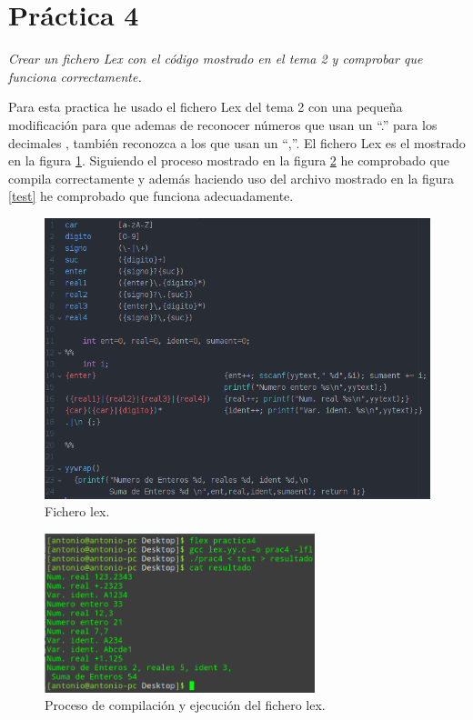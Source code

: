 \section{Práctica 4}
\textit{Crear un fichero Lex con el código mostrado en el tema 2 y comprobar que funciona correctamente.}
\newline

Para esta practica he usado el fichero Lex del tema 2 con una pequeña modificación para que ademas de reconocer números  que usan  un ``.'' para los decimales , también reconozca a los que usan un ``,''. El fichero Lex es el mostrado en la figura \ref{lex}. Siguiendo el proceso mostrado en la figura \ref{prog} he comprobado que compila correctamente y además haciendo uso del archivo mostrado en la figura \ref{test} he comprobado que funciona adecuadamente.

\begin{figure}[H]
    \begin{center}
    \includegraphics[width=1\textwidth]{Imagenes/lex}
        \caption{Fichero lex.}
        \label{lex}
    \end{center}
\end{figure}

\begin{figure}[H]
    \begin{center}
    \includegraphics[width=0.7\textwidth]{Imagenes/prog}
        \caption{Proceso de compilación y ejecución del fichero lex.}
        \label{prog}
    \end{center}
\end{figure}

